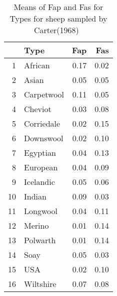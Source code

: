\begin{table}[ht]
\centering
\caption{Means of Fap and Fas for Types for sheep sampled by Carter(1968)~\cite{cart:68}}
\label{tab:fatype}
\begin{tabular}{rlrr}
  \hline
 & Type & Fap & Fas \\ 
  \hline
1 & African & 0.17 & 0.02 \\ 
  2 & Asian & 0.05 & 0.05 \\ 
  3 & Carpetwool & 0.11 & 0.05 \\ 
  4 & Cheviot & 0.03 & 0.08 \\ 
  5 & Corriedale & 0.02 & 0.15 \\ 
  6 & Downswool & 0.02 & 0.10 \\ 
  7 & Egyptian & 0.04 & 0.13 \\ 
  8 & European & 0.04 & 0.09 \\ 
  9 & Icelandic & 0.05 & 0.06 \\ 
  10 & Indian & 0.09 & 0.03 \\ 
  11 & Longwool & 0.04 & 0.11 \\ 
  12 & Merino & 0.01 & 0.14 \\ 
  13 & Polwarth & 0.01 & 0.14 \\ 
  14 & Soay & 0.05 & 0.03 \\ 
  15 & USA & 0.02 & 0.10 \\ 
  16 & Wiltshire & 0.07 & 0.08 \\ 
   \hline
\end{tabular}
\end{table}

